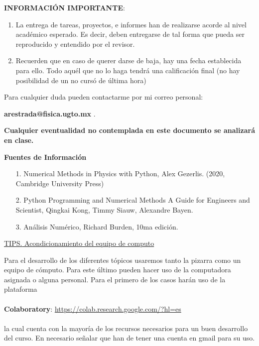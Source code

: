 \documentclass[12pt]{amsart} %
\begin{document}
\vspace{10pt}


\vspace{6pt}
\textbf{INFORMACIÓN IMPORTANTE}:
\begin{enumerate}
	\item  La entrega de tareas, proyectos, e informes han de realizarse acorde al nivel académico esperado. Es decir, deben entregarse de tal forma que pueda ser reproducido y entendido por el revisor.
	\item Recuerden que en caso de querer darse de baja, hay una fecha establecida para ello. Todo aquél que no lo haga tendrá una calificación final (no hay posibilidad de un no cursó de última hora)
\end{enumerate}

\vspace{14pt}

Para cualquier duda pueden contactarme por mi correo personal:

\vspace{4pt}

\textbf{arestrada@fisica.ugto.mx} .

\vspace{14pt}
\textbf{Cualquier eventualidad no contemplada en este documento se analizará en clase.}

\vspace*{22pt} %

\textbf{Fuentes de Información}
\vspace{10pt}
\begin{itemize}
	\item[1.] Numerical Methods in Physics with Python, Alex Gezerlis. (2020, Cambridge University Press)
	\item[2.] Python Programming and Numerical Methods A Guide for Engineers and Scientist, Qingkai Kong, Timmy Siauw, Alexandre Bayen.
	\item[3.] Análisis Numérico, Richard Burden, 10ma edición.
\end{itemize}


\vspace*{22pt}

\uline{\LARGE{TIPS.} Acondicionamiento del equipo de computo}

\vspace*{14pt}

Para el desarrollo de los diferentes tópicos usaremos tanto la pizarra como un equipo de cómputo. Para este último pueden hacer uso de la computadora asignada o alguna personal. Para el primero de los casos harán uso de la plataforma 
\\~\\
\textbf{Colaboratory}: \url{https://colab.research.google.com/?hl=es}
\\~\\
la cual cuenta con la mayoría de los recursos necesarios para un buen desarrollo del curso. En necesario señalar que han de tener una cuenta en gmail para su uso.
\end{document}
